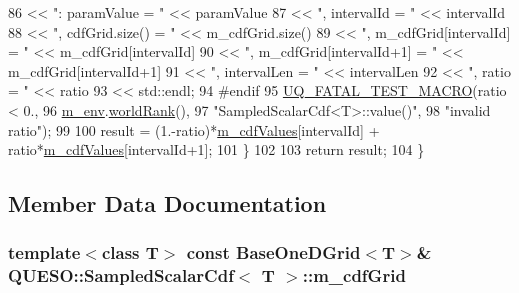\begin{DoxyCode}
86                             << \textcolor{stringliteral}{": paramValue = "}              << paramValue
87                             << \textcolor{stringliteral}{", intervalId = "}              << intervalId
88                             << \textcolor{stringliteral}{", cdfGrid.size() = "}          << m\_cdfGrid.size()
89                             << \textcolor{stringliteral}{", m\_cdfGrid[intervalId] = "}   << m\_cdfGrid[intervalId]
90                             << \textcolor{stringliteral}{", m\_cdfGrid[intervalId+1] = "} << m\_cdfGrid[intervalId+1]
91                             << \textcolor{stringliteral}{", intervalLen = "}             << intervalLen
92                             << \textcolor{stringliteral}{", ratio = "}                   << ratio
93                             << std::endl;
94 \textcolor{preprocessor}{#endif}
95 \textcolor{preprocessor}{}    \hyperlink{_defines_8h_a56d63d18d0a6d45757de47fcc06f574d}{UQ\_FATAL\_TEST\_MACRO}(ratio < 0.,
96                         \hyperlink{class_q_u_e_s_o_1_1_base_scalar_cdf_a3caa986ae1ccef96a28b0365fb88c86c}{m\_env}.\hyperlink{class_q_u_e_s_o_1_1_base_environment_a78b57112bbd0e6dd0e8afec00b40ffa7}{worldRank}(),
97                         \textcolor{stringliteral}{"SampledScalarCdf<T>::value()"},
98                         \textcolor{stringliteral}{"invalid ratio"});
99 
100     result = (1.-ratio)*\hyperlink{class_q_u_e_s_o_1_1_sampled_scalar_cdf_ab8cf649637f31cc75c9f676d5927c10f}{m\_cdfValues}[intervalId] + ratio*\hyperlink{class_q_u_e_s_o_1_1_sampled_scalar_cdf_ab8cf649637f31cc75c9f676d5927c10f}{m\_cdfValues}[intervalId+1];
101   \}
102 
103   \textcolor{keywordflow}{return} result;
104 \}
\end{DoxyCode}


\subsection{Member Data Documentation}
\hypertarget{class_q_u_e_s_o_1_1_sampled_scalar_cdf_a58d6744bac9ce8d906839bf381517f4a}{
\subsubsection[{m\-\_\-cdf\-Grid}]{\setlength{\rightskip}{0pt plus 5cm}template$<$class T$>$ const {\bf Base\-One\-D\-Grid}$<$T$>$\& {\bf Q\-U\-E\-S\-O\-::\-Sampled\-Scalar\-Cdf}$<$ T $>$\-::m\-\_\-cdf\-Grid\hspace{0.3cm}{\ttfamily [protected]}}}\label{class_q_u_e_s_o_1_1_sampled_scalar_cdf_a58d6744bac9ce8d906839bf381517f4a}


